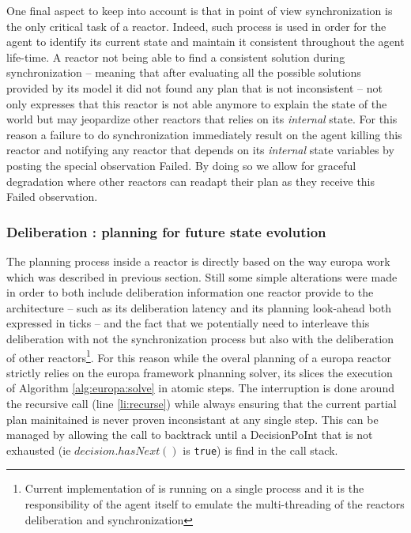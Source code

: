 One final aspect to keep into account is that in \rx point of view
synchronization is the only critical task of a reactor. Indeed, such
process is used in order for the agent to identify its current state
and maintain it consistent throughout the agent life-time. A reactor
not being able to find a consistent solution during synchronization --
meaning that after evaluating all the possible solutions provided by
its model it did not found any plan that is not inconsistent -- not
only expresses that this reactor is not able anymore to explain the
state of the world but may jeopardize other reactors that relies on
its {\em internal} state. For this reason a failure to do
synchronization immediately result on the agent killing this reactor
and notifying any reactor that depends on its {\em internal} state
variables by posting the special observation \textsf{Failed}. By doing
so we allow for graceful degradation where other reactors can readapt
their plan as they receive this \textsf{Failed} observation.

\subsubsection{Deliberation : planning for future state evolution}
\label{sec:arch:plan}

The planning process inside a reactor is directly based on the way
europa work which was described in previous section. Still some simple
alterations were made in order to both include deliberation
information one reactor provide to the architecture -- such as its
deliberation latency and its planning look-ahead both expressed in
ticks -- and the fact that we potentially need to interleave this
deliberation with not the synchronization process but also with the
deliberation of other reactors\footnote{Current implementation of \rx
  is running on a single process and it is the responsibility of the
  agent itself to emulate the multi-threading of the reactors
  deliberation and synchronization}. For this reason while the overal
planning of a europa reactor strictly relies on the europa framework
plnanning solver, its slices the execution of Algorithm
\ref{alg:europa:solve} in atomic steps. The interruption is done
around the recursive call (line \ref{li:recurse}) while always
ensuring that the current partial plan mainitained is never proven
inconsistant at any single step. This can be managed by allowing the
call to backtrack until a DecisionPoInt that is not exhausted (ie
$decision.hasNext()$ is \texttt{true}) is find in the call stack.

